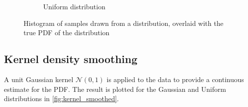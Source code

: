 \documentclass[a4paper]{article}
\begin{document}
\begin{figure}[h]
\begin{subfigure}[b]{0.45\textwidth}
        \caption{Uniform distribution}
        \label{fig:uniform_histogram_and_pdf}
    \end{subfigure}
    \caption{Histogram of samples drawn from a distribution, overlaid with the true PDF of the distribution}
    \label{fig:histogram_and_pdf}
\end{figure}


\subsection{Kernel density smoothing}

A unit Gaussian kernel $\mathcal{N}(0, 1)$ is applied to the data to provide a continuous estimate for the PDF.
The result is plotted for the Gaussian and Uniform distributions in \autoref{fig:kernel_smoothed}.
\end{document}
